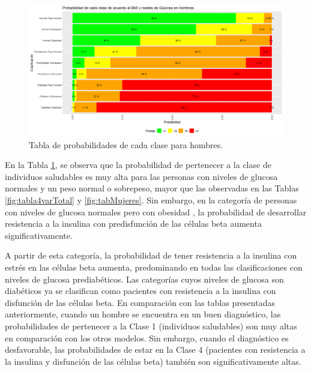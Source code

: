 
\begin{figure}[H]
    \centering
    \includegraphics[height = 10 cm, width = 0.9 \textwidth]{4img/tablaH.png}
    \caption{Tabla de probabilidades de cada clase para hombres.}
    \label{fig:tabla4varHom}
\end{figure}

En la Tabla \ref{fig:tabla4varHom}, se observa que la probabilidad de pertenecer a la clase de individuos saludables es muy alta para las personas con niveles de glucosa normales y un peso normal o sobrepeso, mayor que las observadas en las Tablas \ref{fig:tabla4varTotal} y \ref{fig:tabMujeres}. Sin embargo, en la categoría de personas con niveles de glucosa normales pero con obesidad , la probabilidad de desarrollar resistencia a la insulina con predisfunción de las células beta aumenta significativamente.

A partir de esta categoría, la probabilidad de tener resistencia a la insulina con estrés en las células beta aumenta, predominando en todas las clasificaciones con niveles de glucosa prediabéticos. Las categorías cuyos niveles de glucosa son diabéticos ya se clasifican como pacientes con resistencia a la insulina con disfunción de las células beta. En comparación con las tablas presentadas anteriormente, cuando un hombre se encuentra en un buen diagnóstico, las probabilidades de pertenecer a la Clase 1 (individuos saludables) son muy altas en comparación con los otros modelos. Sin embargo, cuando el diagnóstico es desfavorable, las probabilidades de estar en la Clase 4 (pacientes con resistencia a la insulina y disfunción de las células beta) también son significativamente altas.

